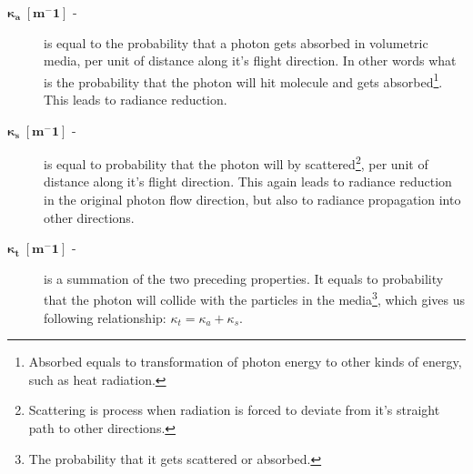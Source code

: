 \begin{description}
\item[$\boldsymbol{\kappa_{a}\; [m^-1]}$ - ] is equal to the probability that a photon gets absorbed in volumetric media, per unit of distance along it's flight direction. In other words what is the probability that the photon will hit molecule and gets absorbed\footnote{Absorbed equals to transformation of photon energy to other kinds of energy, such as heat radiation.}. This leads to radiance reduction.

\item[$\boldsymbol{\kappa_{s}\; [m^-1]}$ - ] is equal to probability that the photon will by scattered\footnote{Scattering is process when radiation is forced to deviate from it's straight path to other directions.}, per unit of distance along it's flight direction. This again leads to radiance reduction in the original photon flow direction, but also to radiance propagation into other directions.

\item[$\boldsymbol{\kappa_{t}\; [m^-1]}$ - ] is a summation of the two preceding properties. It equals to probability that the photon will collide with the particles in the media\footnote{The probability that it gets scattered or absorbed.}, which gives us following relationship: $\kappa_{t}=\kappa_{a}+\kappa_{s}$.

\end{description}
